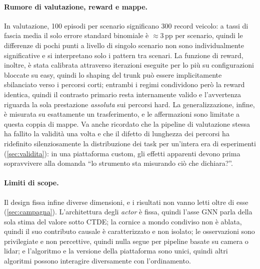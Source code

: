 \paragraph{Rumore di valutazione, reward e mappe.}
In valutazione, 100 episodi per scenario significano 300 record
veicolo: a tassi di fascia media il solo errore standard binomiale è
$\approx$3\,pp per scenario, quindi le differenze di pochi punti a
livello di singolo scenario non sono individualmente significative e si
interpretano solo i pattern tra scenari. La funzione di reward, inoltre,
è stata calibrata attraverso iterazioni eseguite per lo più su
configurazioni bloccate su easy, quindi lo shaping del trunk può essere
implicitamente sbilanciato verso i percorsi corti; entrambi i regimi
condividono però la reward identica, quindi il contrasto primario resta
internamente valido e l'avvertenza riguarda la sola prestazione
\emph{assoluta} sui percorsi hard. La generalizzazione, infine, è
misurata su esattamente un trasferimento, e le affermazioni sono
limitate a questa coppia di mappe. Va anche ricordato che la pipeline di
valutazione stessa ha fallito la validità una volta e che il difetto di
lunghezza dei percorsi ha ridefinito silenziosamente la distribuzione
dei task per un'intera era di esperimenti (\cref{sec:validita}): in una
piattaforma custom, gli effetti apparenti devono prima sopravvivere alla
domanda ``lo strumento sta misurando ciò che dichiara?''.

\paragraph{Limiti di scope.}
Il design fissa infine diverse dimensioni, e i risultati non vanno letti
oltre di esse (\cref{sec:campagna}). L'architettura degli \emph{actor} è
fissa, quindi l'asse GNN parla della sola stima del valore sotto CTDE; la
cornice a mondo condiviso non è ablata, quindi il suo contributo causale
è caratterizzato e non isolato; le osservazioni sono privilegiate e non
percettive, quindi nulla segue per pipeline basate su camera o lidar; e
l'algoritmo e la versione della piattaforma sono unici, quindi altri
algoritmi possono interagire diversamente con l'ordinamento.
